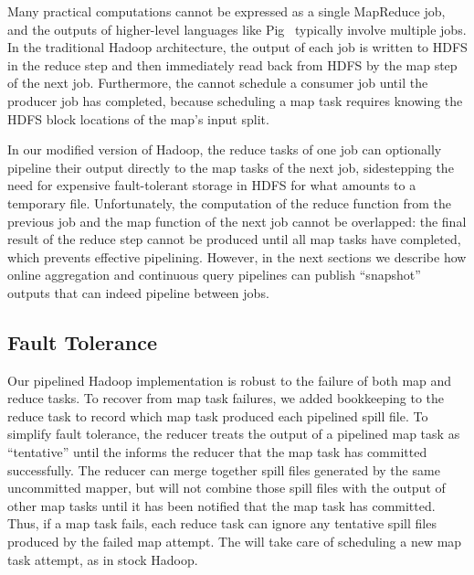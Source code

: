 Many practical computations cannot be expressed as a single MapReduce job, and
the outputs of higher-level languages like Pig~\cite{pig-sigmod} typically involve
multiple jobs.  In the traditional Hadoop architecture, the output of each job
is written to HDFS in the reduce step and then immediately read back from HDFS
by the map step of the next job. Furthermore, the {\JT} cannot schedule a
consumer job until the producer job has completed, because scheduling a map task
requires knowing the HDFS block locations of the map's input split.

In our modified version of Hadoop, the reduce tasks of one job can optionally
pipeline their output directly to the map tasks of the next job, sidestepping
the need for expensive fault-tolerant storage in HDFS for what amounts to a
temporary file. Unfortunately, the computation of the reduce function from the
previous job and the map function of the next job cannot be overlapped: the
final result of the reduce step cannot be produced until all map tasks have
completed, which prevents effective pipelining. However, in the next sections we
describe how online aggregation and continuous query pipelines can publish
``snapshot'' outputs that can indeed pipeline between jobs.

\subsection{Fault Tolerance}
\label{ch:hop:sec:ft}


Our pipelined Hadoop implementation is robust to the failure of both
map and reduce tasks. To recover from map task failures, we added
bookkeeping to the reduce task to record which map task produced each
pipelined spill file. To simplify fault tolerance, the reducer treats
the output of a pipelined map task as ``tentative'' until the {\JT}
informs the reducer that the map task has committed successfully. The
reducer can merge together spill files generated by the same
uncommitted mapper, but will not combine those spill files with the
output of other map tasks until it has been notified that the map task
has committed. Thus, if a map task fails, each reduce task can ignore
any tentative spill files produced by the failed map attempt. The
{\JT} will take care of scheduling a new map task attempt, as in stock
Hadoop. 

